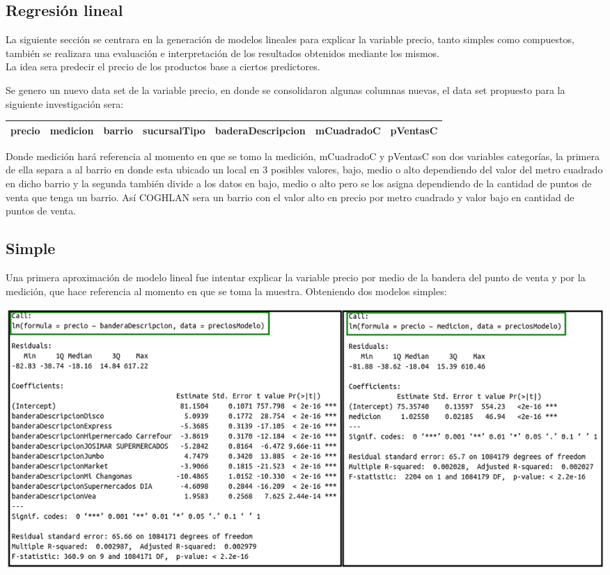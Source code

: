 \subsection{Regresión lineal}

La siguiente sección se centrara en la generación de modelos lineales para explicar la variable precio, tanto simples como compuestos, también se realizara una evaluación e interpretación de los resultados obtenidos mediante los mismos.\\
La idea sera predecir el precio de los productos base a ciertos predictores.

Se genero un nuevo data set de la variable precio, en donde se consolidaron algunas columnas nuevas, el data set propuesto para la siguiente investigación sera:


\begin{center}
 \begin{tabular}{||c c c c c c c||} 
 \hline
    precio & medicion & barrio & sucursalTipo &
    baderaDescripcion & mCuadradoC & pVentasC \\ 
 \hline
 \hline
\end{tabular}
\end{center}

Donde medición hará referencia al momento en que se tomo la medición, mCuadradoC y pVentasC son dos variables categorías, la primera de ella separa a al barrio en donde esta ubicado un local en 3 posibles valores, bajo, medio o alto dependiendo del valor del metro cuadrado en dicho barrio y la segunda también divide a los datos en bajo, medio o alto pero se los asigna dependiendo de la cantidad de puntos de venta que tenga un barrio. Así COGHLAN sera un barrio con el valor alto en precio por metro cuadrado y valor bajo en cantidad de puntos de venta.


\subsection{Simple}

Una primera aproximación de modelo lineal fue intentar explicar la variable precio por medio de la bandera del punto de venta y por la medición, que hace referencia al momento en que se toma la muestra. Obteniendo dos modelos simples:

\begin{center}
    \includegraphics[scale=0.5]{img/ln_simple.png}
\end{center}

